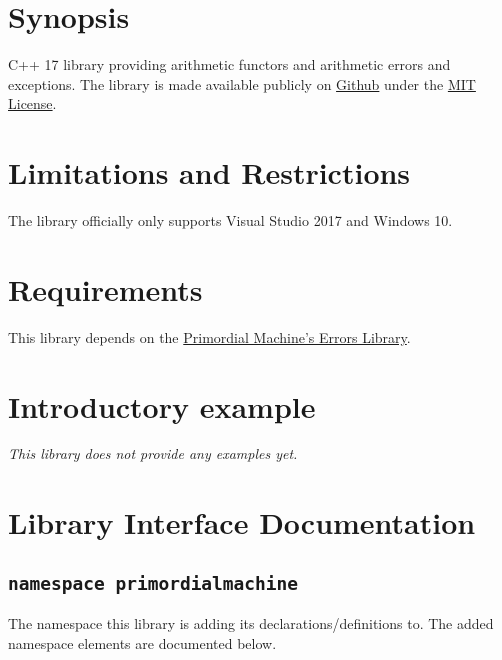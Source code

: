 \documentclass[oneside]{book}
\begin{document}
\frontmatter

\begin{titlepage}
\maketitle
\end{titlepage}

\tableofcontents
{}

\mainmatter

\chapter{Synopsis}
C++ 17 library providing arithmetic functors and arithmetic errors and exceptions.
The library is made available publicly on
\href{\GetLibraryRepository}{Github}
under the
\href{\GetLibraryRepository/blob/master/LICENSE}{MIT License}.

\chapter{Limitations and Restrictions}
The library officially only supports Visual Studio 2017 and Windows 10.

\chapter{Requirements}
This library depends on the \href{https://github.com/primordialmachine/errors}{Primordial Machine's Errors Library}.

\chapter{Introductory example}
\textit{\color{orange}This library does not provide any examples yet.}



\chapter{Library Interface Documentation}

\section{\texttt{namespace primordialmachine}}
The namespace this library is adding its declarations/definitions to.
The added namespace elements are documented below.
\end{document}
